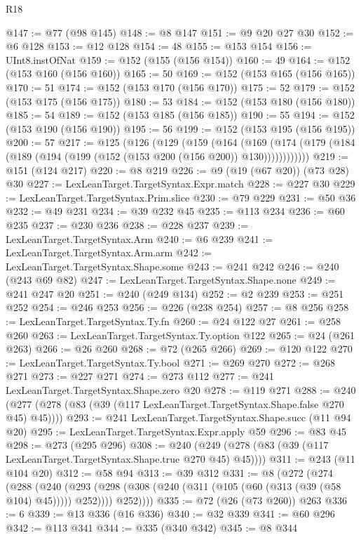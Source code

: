 \begin{lexlean}{R18}
\begin{coremodule}
@147 := @77 (@98 @145)
@148 := @8 @147
@151 := @9 @20 @27 @30
@152 := @6 @128
@153 := @12 @128
@154 := 48
@155 := @153 @154
@156 := UInt8.instOfNat
@159 := @152 (@155 (@156 @154))
@160 := 49
@164 := @152 (@153 @160 (@156 @160))
@165 := 50
@169 := @152 (@153 @165 (@156 @165))
@170 := 51
@174 := @152 (@153 @170 (@156 @170))
@175 := 52
@179 := @152 (@153 @175 (@156 @175))
@180 := 53
@184 := @152 (@153 @180 (@156 @180))
@185 := 54
@189 := @152 (@153 @185 (@156 @185))
@190 := 55
@194 := @152 (@153 @190 (@156 @190))
@195 := 56
@199 := @152 (@153 @195 (@156 @195))
@200 := 57
@217 := @125
    (@126
      (@129
        (@159
          (@164
            (@169 (@174 (@179 (@184 (@189 (@194 (@199 (@152 (@153 @200 (@156 @200)) @130))))))))))))
@219 := @151 (@124 @217)
@220 := @8 @219
@226 := @9 (@19 (@67 @20)) (@73 @28) @30
@227 := LexLeanTarget.TargetSyntax.Expr.match
@228 := @227 @30
@229 := LexLeanTarget.TargetSyntax.Prim.slice
@230 := @79 @229
@231 := @50 @36
@232 := @49 @231
@234 := @39 @232 @45
@235 := @113 @234
@236 := @60 @235
@237 := @230 @236
@238 := @228 @237
@239 := LexLeanTarget.TargetSyntax.Arm
@240 := @6 @239
@241 := LexLeanTarget.TargetSyntax.Arm.arm
@242 := LexLeanTarget.TargetSyntax.Shape.some
@243 := @241 @242
@246 := @240 (@243 @69 @82)
@247 := LexLeanTarget.TargetSyntax.Shape.none
@249 := @241 @247 @20
@251 := @240 (@249 @134)
@252 := @2 @239
@253 := @251 @252
@254 := @246 @253
@256 := @226 (@238 @254)
@257 := @8 @256
@258 := LexLeanTarget.TargetSyntax.Ty.fn
@260 := @24 @122 @27
@261 := @258 @260
@263 := LexLeanTarget.TargetSyntax.Ty.option @122
@265 := @24 (@261 @263)
@266 := @26 @260
@268 := @72 (@265 @266)
@269 := @120 @122
@270 := LexLeanTarget.TargetSyntax.Ty.bool
@271 := @269 @270
@272 := @268 @271
@273 := @227 @271
@274 := @273 @112
@277 := @241 LexLeanTarget.TargetSyntax.Shape.zero @20
@278 := @119 @271
@288 := @240 (@277 (@278 (@83 (@39 (@117 LexLeanTarget.TargetSyntax.Shape.false @270 @45) @45))))
@293 := @241 LexLeanTarget.TargetSyntax.Shape.succ (@11 @94 @20)
@295 := LexLeanTarget.TargetSyntax.Expr.apply @59
@296 := @83 @45
@298 := @273 (@295 @296)
@308 := @240 (@249 (@278 (@83 (@39 (@117 LexLeanTarget.TargetSyntax.Shape.true @270 @45) @45))))
@311 := @243 (@11 @104 @20)
@312 := @58 @94
@313 := @39 @312
@331 := @8
    (@272
      (@274
        (@288
          (@240
            (@293 (@298 (@308 (@240 (@311 (@105 (@60 (@313 (@39 (@58 @104) @45))))) @252))))
            @252))))
@335 := @72 (@26 (@73 @260)) @263
@336 := 6
@339 := @13 @336 (@16 @336)
@340 := @32 @339
@341 := @60 @296
@342 := @113 @341
@344 := @335 (@340 @342)
@345 := @8 @344

\end{coremodule}
\end{lexlean}
